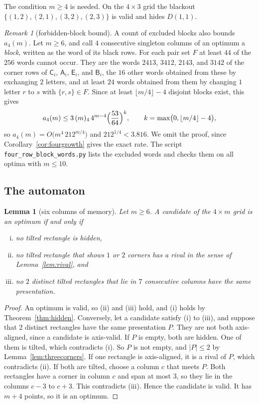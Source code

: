 \documentclass[12pt]{article}
\theoremstyle{plain}
\newtheorem{lemma}[theorem]{Lemma}
\theoremstyle{definition}
\theoremstyle{remark}
\newtheorem{remark}[theorem]{Remark}
\newcommand{\kA}{\mathsf{A}}
\newcommand{\kB}{\mathsf{B}}
\newcommand{\kC}{\mathsf{C}}
\newcommand{\kE}{\mathsf{E}}
\begin{document}
The condition $m\ge4$ is needed. On the $4\times3$ grid the blackout
$\{(1,2),(2,1),(3,2),(2,3)\}$ is valid and hides $D(1,1)$.

\begin{remark}[forbidden-block bound]\label{thm:foursurvival}
A count of excluded blocks also bounds $a_4(m)$. Let $m\ge6$, and call $4$
consecutive singleton columns of an optimum a \emph{block}, written as the word of
its black rows. For each pair set $F$ at least $44$ of the $256$ words cannot
occur. They are the words $2413$, $3412$, $2143$, and $3142$ of the corner rows of
$\kC_i$, $\kA_i$, $\kE_i$, and $\kB_i$, the $16$ other words obtained from these by
exchanging $2$ letters, and at least $24$ words obtained from them by changing $1$
letter $r$ to $s$ with $\{r,s\}\in F$. Since at least $\lfloor m/4\rfloor-4$ disjoint
blocks exist, this gives
\[
a_4(m)\le3\,(m)_4\,4^{m-4}\Bigl(\frac{53}{64}\Bigr)^{k},\qquad
k=\max\bigl(0,\lfloor m/4\rfloor-4\bigr),
\]
so $a_4(m)=O\bigl(m^4\,212^{m/4}\bigr)$ and $212^{1/4}<3.816$. We omit the proof,
since Corollary~\ref{cor:fourgrowth} gives the exact rate. The script
\nolinkurl{four_row_block_words.py} lists the excluded words and checks them on
all optima with $m\le10$.
\end{remark}

\subsection{The automaton}

\begin{lemma}[six columns of memory]\label{lem:fourmemory}
Let $m\ge6$. A candidate of the $4\times m$ grid is an optimum if and only if
\begin{enumerate}[(i)]
\item no tilted rectangle is hidden,
\item no tilted rectangle that shows $1$ or $2$ corners has a rival in the sense
of Lemma~\ref{lem:rival}, and
\item no $2$ distinct tilted rectangles that lie in $7$ consecutive columns have
the same presentation.
\end{enumerate}
\end{lemma}

\begin{proof}
An optimum is valid, so (ii) and (iii) hold, and (i) holds by
Theorem~\ref{thm:hidden}. Conversely, let a candidate satisfy (i) to (iii), and
suppose that $2$ distinct rectangles have the same presentation $P$. They are not
both axis-aligned, since a candidate is axis-valid. If $P$ is empty, both
are hidden. One of them is tilted, which contradicts (i). So $P$ is not empty,
and $|P|\le2$ by Lemma~\ref{lem:threecorners}. If one rectangle is
axis-aligned, it is a rival of $P$, which contradicts (ii). If both are tilted,
choose a column $c$ that meets $P$. Both rectangles have a corner in column $c$
and span at most $3$, so they lie in the columns $c-3$ to $c+3$. This
contradicts (iii). Hence the candidate is valid. It has $m+4$ points, so it is
an optimum.
\end{proof}
\end{document}
